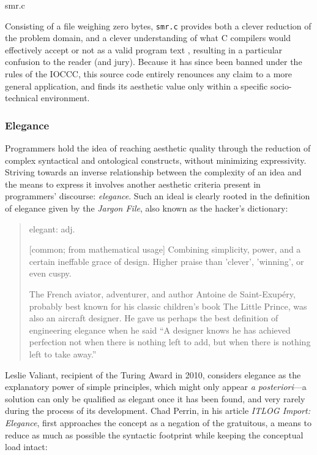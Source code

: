 \begin{listing}
  \inputminted{c}{./corpus/smr.c}
  \caption{smr.c}
  \label{code:smr_c}
\end{listing}

Consisting of a file weighing zero bytes, \lstinline{smr.c} provides both a clever reduction of the problem domain, and a clever understanding of what C compilers would effectively accept or not as a valid program text \citep{kanakarakis_international_2022}, resulting in a particular confusion to the reader (and jury). Because it has since been banned under the rules of the IOCCC, this source code entirely renounces any claim to a more general application, and finds its aesthetic value only within a specific socio-technical environment.

\subsubsection{Elegance}
\label{subsubsec:elegance}

Programmers hold the idea of reaching aesthetic quality through the reduction of complex syntactical and ontological constructs, without minimizing expressivity. Striving towards an inverse relationship between the complexity of an idea and the means to express it involves another aesthetic criteria present in programmers' discourse: \emph{elegance}. Such an ideal is clearly rooted in the definition of elegance given by the \emph{Jargon File}, also known as the hacker's dictionary:

\begin{quote}
  elegant: adj.

    [common; from mathematical usage] Combining simplicity, power, and a certain ineffable grace of design. Higher praise than 'clever', 'winning', or even cuspy.

    The French aviator, adventurer, and author Antoine de Saint-Exupéry, probably best known for his classic children's book The Little Prince, was also an aircraft designer. He gave us perhaps the best definition of engineering elegance when he said “A designer knows he has achieved perfection not when there is nothing left to add, but when there is nothing left to take away.” \citep{jargonfile4.4.7_elegant_2003}
\end{quote}

Leslie Valiant, recipient of the Turing Award in 2010, considers elegance as the explanatory power of simple principles, which might only appear \emph{a posteriori}—a solution can only be qualified as elegant once it has been found, and very rarely during the process of its development\citep{anthes_beauty_2011}. Chad Perrin, in his article \emph{ITLOG Import: Elegance}, first approaches the concept as a negation of the gratuitous, a means to reduce as much as possible the syntactic footprint while keeping the conceptual load intact:

